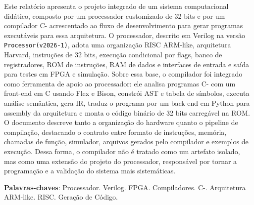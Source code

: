 \documentclass[
	12pt,				%
	oneside,
	a4paper,			%
	english,			%
	french,				%
	spanish,			%
	brazil,				%
	]{abntex2}
\begin{document}
\frenchspacing

\imprimircapa
\imprimirfolhaderosto*

\setlength{\absparsep}{18pt}
\begin{resumo}
    Este relatório apresenta o projeto integrado de um sistema computacional didático, composto por um processador customizado de 32 bits e por um compilador C- acrescentado ao fluxo de desenvolvimento para gerar programas executáveis para essa arquitetura. O processador, descrito em Verilog na versão \texttt{Processor(v2026-1)}, adota uma organização RISC ARM-like, arquitetura Harvard, instruções de 32 bits, execução condicional por flags, banco de registradores, ROM de instruções, RAM de dados e interfaces de entrada e saída para testes em FPGA e simulação. Sobre essa base, o compilador foi integrado como ferramenta de apoio ao processador: ele analisa programas C- com um front-end em C usando Flex e Bison, constrói AST e tabela de símbolos, executa análise semântica, gera IR, traduz o programa por um back-end em Python para assembly da arquitetura e monta o código binário de 32 bits carregável na ROM. O documento descreve tanto a organização do hardware quanto o pipeline de compilação, destacando o contrato entre formato de instruções, memória, chamadas de função, simulador, arquivos gerados pelo compilador e exemplos de execução. Dessa forma, o compilador não é tratado como um artefato isolado, mas como uma extensão do projeto do processador, responsável por tornar a programação e a validação do sistema mais sistemáticas.

    \noindent
    \textbf{Palavras-chaves}: Processador. Verilog. FPGA. Compiladores. C-. Arquitetura ARM-like. RISC. Geração de Código.
\end{resumo}

\listoffigures*
\clearpage

\listoftables*
\clearpage

\tableofcontents*

\textual

\end{document}
